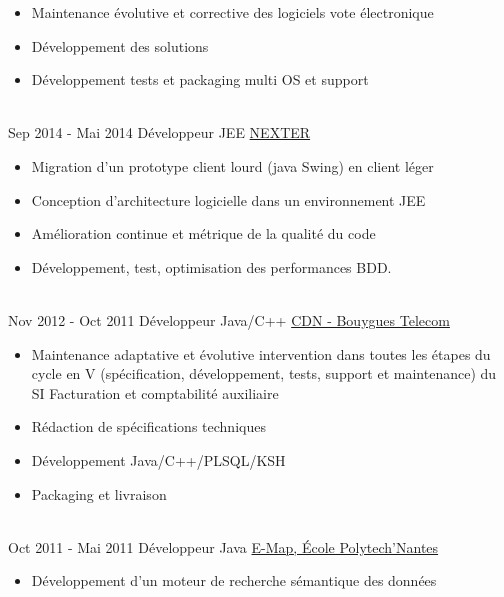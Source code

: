 \documentclass[letterpaper]{twentysecondcv} %
\begin{document}
\begin{twenty}
{\begin{itemize}
				\item Maintenance évolutive et corrective des logiciels vote électronique
				\item Développement des solutions
				\item Développement tests et packaging multi OS et support
			\end{itemize}
		}
		\\   
		\twentyitem
		{Sep 2014 -}
		{Mai 2014}
		{Développeur JEE}
		{\href{https://www.nexter-group.fr/}{NEXTER}}
		{}
		{
			\begin{itemize}
				\item Migration d'un prototype client lourd (java Swing) en client léger
				\item Conception d'architecture logicielle dans un environnement JEE
				\item Amélioration continue et métrique de la qualité du code
				\item Développement, test, optimisation des performances BDD.
			\end{itemize}
		}       
		\\
		\twentyitem
		{Nov 2012 -}
		{Oct 2011}
		{Développeur Java/C++}
		{\href{https://www.jobs.bouyguestelecom.fr/}{CDN - Bouygues Telecom}}
		{}
		{
			\begin{itemize}
				\item Maintenance adaptative et évolutive intervention dans toutes les étapes du cycle en V (spécification, développement, tests, support et maintenance) du SI Facturation et comptabilité auxiliaire
				\item Rédaction de spécifications techniques
				\item Développement Java/C++/PLSQL/KSH
				\item Packaging et livraison	
			\end{itemize}
		}
		
		\\
		\twentyitem
		{Oct 2011 -}
		{Mai 2011}
		{Développeur Java}
		{\href{}{E-Map, École Polytech'Nantes}}
		{}
		{
			\begin{itemize}
				\item Développement d'un moteur de recherche sémantique des données
			\end{itemize}
		}
		
		\\
	\end{twenty}
\end{document}
